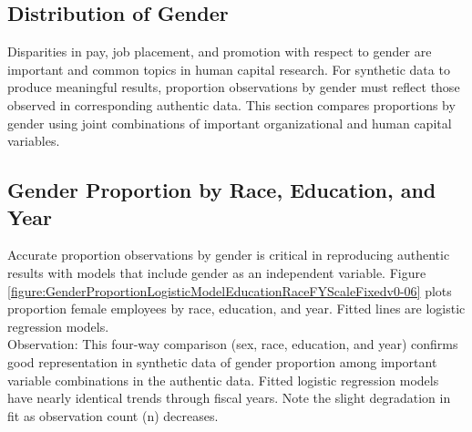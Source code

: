 \documentclass[10pt, letterpaper]{article}
\begin{document}
\begin{spacing}{1.0}
\clearpage

\section{Distribution of Gender}

Disparities in pay, job placement, and promotion with respect to gender are important and common topics in human capital research.  For synthetic data to produce meaningful results, proportion observations by gender must reflect those observed in corresponding authentic data.  This section compares proportions by gender using joint combinations of important organizational and human capital variables.

\subsection{Gender Proportion by Race, Education, and Year}

Accurate proportion observations by gender is critical in reproducing authentic results with models that include gender as an independent variable.  Figure \ref{figure:GenderProportionLogisticModelEducationRaceFYScaleFixedv0-06} plots proportion female employees by race, education, and year.  Fitted lines are logistic regression models.\\

Observation:  This four-way comparison (sex, race, education, and year) confirms good representation in synthetic data of gender proportion among important variable combinations in the authentic data.  Fitted logistic regression models have nearly identical trends through fiscal years.  Note the slight degradation in fit as observation count (n) decreases.\\

\vspace{20pt}


\end{spacing}
\end{document}

